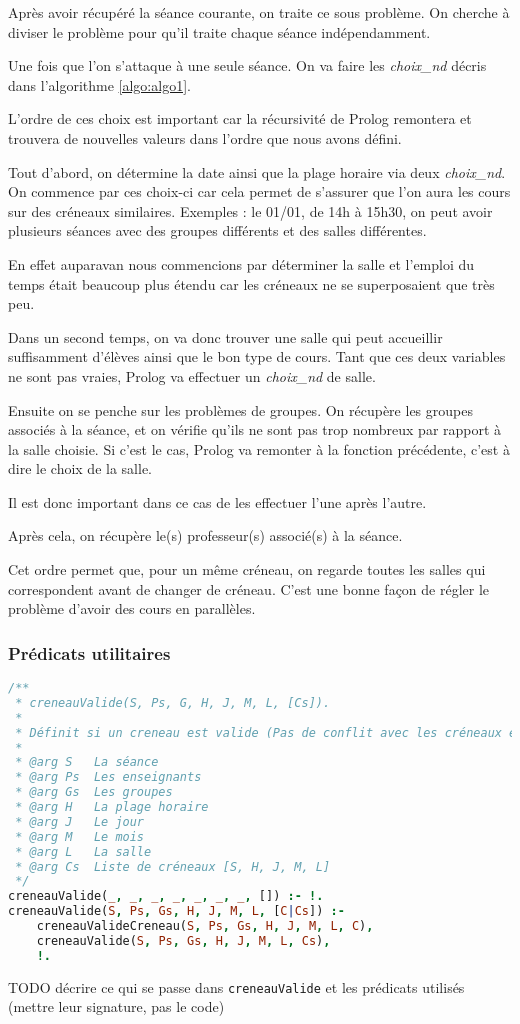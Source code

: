 Après avoir récupéré la séance courante, on traite ce sous problème. 
On cherche à diviser le problème pour qu'il traite chaque séance indépendamment. 

Une fois que l'on s'attaque à une seule séance. On va faire les \emph{choix\_nd} décris dans l'algorithme \ref{algo:algo1}.

L'ordre de ces choix est important car la récursivité de Prolog remontera et trouvera de nouvelles valeurs dans l'ordre que nous avons défini.

Tout d'abord, on détermine la date ainsi que la plage horaire via deux \emph{choix\_nd}. 
On commence par ces choix-ci car cela permet de s'assurer que l'on aura les cours sur des créneaux similaires. 
Exemples : le 01/01, de 14h à 15h30, on peut avoir plusieurs séances avec des groupes différents et des salles différentes.

En effet auparavan nous commencions par déterminer la salle et l'emploi du temps était beaucoup plus étendu car les créneaux ne se superposaient que très peu.

Dans un second temps, on va donc trouver une salle qui peut accueillir suffisamment d'élèves ainsi que le bon type de cours. Tant que ces deux variables ne sont pas vraies, Prolog va effectuer un \emph{choix\_nd} de salle.

Ensuite on se penche sur les problèmes de groupes. 
On récupère les groupes associés à la séance, et on vérifie qu'ils ne sont pas trop nombreux par rapport à la salle choisie. 
Si c'est le cas, Prolog va remonter à la fonction précédente, c'est à dire le choix de la salle. 

Il est donc important dans ce cas de les effectuer l'une après l'autre.

Après cela, on récupère le(s) professeur(s) associé(s) à la séance.

Cet ordre permet que, pour un même créneau, on regarde toutes les salles qui correspondent avant de changer de créneau. C'est une bonne façon de régler le problème d'avoir des cours en parallèles.

\subsubsection{Prédicats utilitaires}

\begin{lstlisting}[language=Prolog, caption=creneauValide, captionpos=b]
/**
 * creneauValide(S, Ps, G, H, J, M, L, [Cs]).
 *
 * Définit si un creneau est valide (Pas de conflit avec les créneaux existants)
 *
 * @arg S   La séance
 * @arg Ps  Les enseignants
 * @arg Gs  Les groupes
 * @arg H   La plage horaire
 * @arg J   Le jour
 * @arg M   Le mois
 * @arg L   La salle
 * @arg Cs  Liste de créneaux [S, H, J, M, L]
 */
creneauValide(_, _, _, _, _, _, _, []) :- !.
creneauValide(S, Ps, Gs, H, J, M, L, [C|Cs]) :-
    creneauValideCreneau(S, Ps, Gs, H, J, M, L, C),
    creneauValide(S, Ps, Gs, H, J, M, L, Cs),
    !.
\end{lstlisting}

TODO décrire ce qui se passe dans \texttt{creneauValide} et les prédicats
utilisés (mettre leur signature, pas le code)




